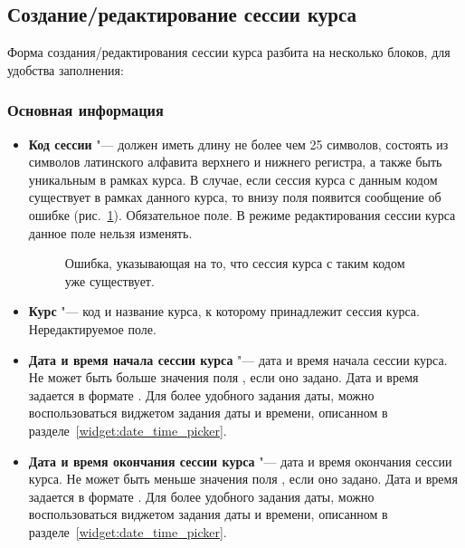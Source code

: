 \subsection{Создание/редактирование сессии курса}
Форма создания/редактирования сессии курса разбита на несколько блоков, для удобства заполнения:
	\subsubsection{Основная информация}
	\begin{itemize}
		\item \textbf{Код сессии} "--- должен иметь длину не более чем 25 символов, состоять из символов латинского алфавита верхнего и нижнего регистра, а также быть уникальным в рамках курса. В случае, если сессия курса с данным кодом существует в рамках данного курса, то внизу поля появится сообщение об ошибке (рис.~\ref{img:course_session:slug_error}). Обязательное поле. В режиме редактирования сессии курса данное поле нельзя изменять.
		\begin{figure}[H]
			\caption{Ошибка, указывающая на то, что сессия курса с таким кодом уже существует.}
			\label{img:course_session:slug_error}
		\end{figure}
		
		\item \textbf{Курс} "--- код и название курса, к которому принадлежит сессия курса. Нередактируемое поле.
		\item \textbf{Дата и время начала сессии курса} "--- дата и время начала сессии курса. Не может быть больше значения поля , если оно задано. Дата и время задается в формате . Для более удобного задания даты, можно воспользоваться виджетом задания даты и времени, описанном в разделе~\ref{widget:date_time_picker}.
		
		\item \textbf{Дата и время окончания сессии курса} "--- дата и время окончания сессии курса. Не может быть меньше значения поля , если оно задано. Дата и время задается в формате . Для более удобного задания даты, можно воспользоваться виджетом задания даты и времени, описанном в разделе~\ref{widget:date_time_picker}.
		

\end{itemize}
